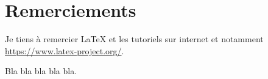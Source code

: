 \section*{Remerciements}

Je tiens à remercier \LaTeX{} et les tutoriels sur internet et notamment \url{https://www.latex-project.org/}.

Bla bla bla bla bla.

